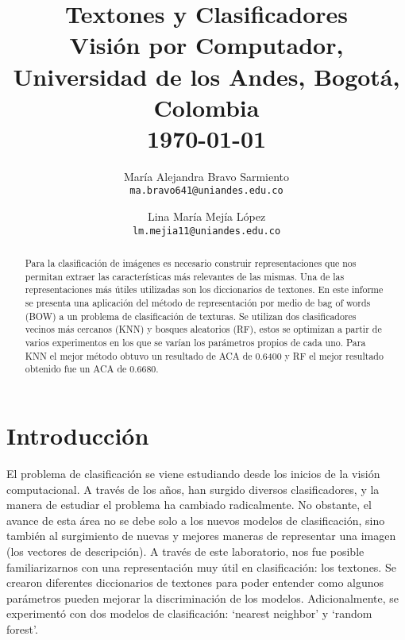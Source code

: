 \documentclass[10pt,twocolumn,letterpaper]{article}
\begin{document}
\title{Textones y Clasificadores\\
{\small Visión por Computador, Universidad de los Andes, Bogotá, Colombia\\
\today} 
}

\author{María Alejandra Bravo Sarmiento\\
{\tt\small ma.bravo641@uniandes.edu.co}
\and
Lina María Mejía López\\
{\tt\small lm.mejia11@uniandes.edu.co}
}

\maketitle

\begin{abstract}
Para la clasificación de imágenes es necesario construir representaciones que nos permitan extraer las características más relevantes de las mismas. Una de las representaciones más útiles utilizadas son los diccionarios de textones. En este informe se presenta una aplicación del método de representación por medio de bag of words (BOW) a un problema de clasificación de texturas. Se utilizan dos clasificadores vecinos más cercanos (KNN) y bosques aleatorios (RF), estos se optimizan a partir de varios experimentos en los que se varían los parámetros propios de cada uno. Para KNN el mejor método obtuvo un resultado de ACA de 0.6400 y RF el mejor resultado obtenido fue un ACA de 0.6680. 
\end{abstract}
\section{Introducción}
El problema de clasificación se viene estudiando desde los inicios de la visión computacional. A través de los años, han surgido diversos clasificadores, y la manera de estudiar el problema ha cambiado radicalmente. No obstante, el avance de esta área no se debe solo a los nuevos modelos de clasificación, sino también al surgimiento de nuevas y mejores maneras de representar una imagen (los vectores de descripción). A través de este laboratorio, nos fue posible familiarizarnos con una representación muy útil en clasificación: los textones. Se crearon diferentes diccionarios de textones para poder entender como algunos parámetros pueden mejorar la discriminación de los modelos. Adicionalmente, se experimentó con dos modelos de clasificación: ‘nearest neighbor’ y ‘random forest’. 
\end{document}
